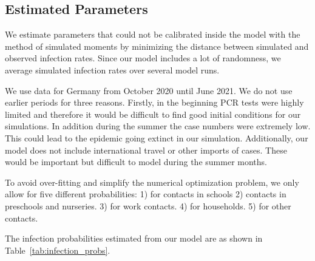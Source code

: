 \subsection{Estimated Parameters}
\label{subsec:estimated_params}


\FloatBarrier

We estimate parameters that could not be calibrated inside the model with the
method of simulated moments \citep{McFadden1989} by minimizing the distance between
simulated and observed infection rates. Since our model includes a lot of randomness, we
average simulated infection rates over several model runs.

We use data for Germany from October 2020 until June 2021. We do not use
earlier periods for three reasons. Firstly, in the beginning PCR tests were highly
limited and therefore it would be difficult to find good initial conditions for our
simulations. In addition during the summer the case numbers were extremely low. This
could lead to the epidemic going extinct in our simulation. Additionally, our model does
not include international travel or other imports of cases. These would be important but
difficult to model during the summer months.


To avoid over-fitting and simplify the numerical optimization problem, we only allow for
five different probabilities: 1) for contacts in schools 2) contacts in preschools and
nurseries. 3) for work contacts. 4) for households. 5) for other contacts.

The infection probabilities estimated from our model are as shown in
Table~\ref{tab:infection_probs}.

